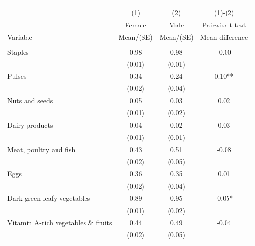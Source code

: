 
\begin{tabular}{@{\extracolsep{5pt}}lccc}
\\[-1.8ex]\hline \hline \\[-1.8ex]
 & \multicolumn{1}{c}{(1)}  & \multicolumn{1}{c}{(2)}  & \multicolumn{1}{c}{(1)-(2)} \\
 & \multicolumn{1}{c}{Female}  & \multicolumn{1}{c}{Male}  & \multicolumn{1}{c}{Pairwise t-test}  \\
Variable & Mean/(SE) & Mean/(SE) & Mean difference \\ \hline \\[-1.8ex] 
Staples   & 0.98    & 0.98    & -0.00   \\
 & (0.01)  & (0.01)  &  \\ [1ex]
Pulses   & 0.34    & 0.24    & 0.10**   \\
 & (0.02)  & (0.04)  &  \\ [1ex]
Nuts and seeds   & 0.05    & 0.03    & 0.02   \\
 & (0.01)  & (0.02)  &  \\ [1ex]
Dairy products   & 0.04    & 0.02    & 0.03   \\
 & (0.01)  & (0.01)  &  \\ [1ex]
Meat, poultry and fish   & 0.43    & 0.51    & -0.08   \\
 & (0.02)  & (0.05)  &  \\ [1ex]
Eggs   & 0.36    & 0.35    & 0.01   \\
 & (0.02)  & (0.04)  &  \\ [1ex]
Dark green leafy vegetables   & 0.89    & 0.95    & -0.05*   \\
 & (0.01)  & (0.02)  &  \\ [1ex]
Vitamin A-rich vegetables \& fruits   & 0.44    & 0.49    & -0.04   \\
 & (0.02)  & (0.05)  &  \\ [1ex]

\end{tabular}
